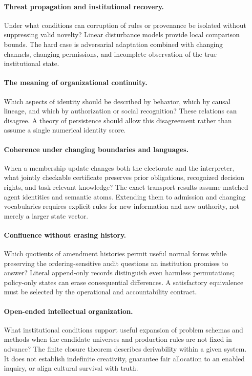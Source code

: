 \documentclass[11pt,letterpaper]{article}
\theoremstyle{plain}
\theoremstyle{definition}
\theoremstyle{remark}
\begin{document}
\paragraph{Threat propagation and institutional recovery.}
Under what conditions can corruption of rules or provenance be isolated without suppressing valid novelty? Linear disturbance models provide local comparison bounds. The hard case is adversarial adaptation combined with changing channels, changing permissions, and incomplete observation of the true institutional state.

\paragraph{The meaning of organizational continuity.}
Which aspects of identity should be described by behavior, which by causal lineage, and which by authorization or social recognition? These relations can disagree. A theory of persistence should allow this disagreement rather than assume a single numerical identity score.

\paragraph{Coherence under changing boundaries and languages.}
When a membership update changes both the electorate and the interpreter, what jointly checkable certificate preserves prior obligations, recognized decision rights, and task-relevant knowledge? The exact transport results assume matched agent identities and semantic atoms. Extending them to admission and changing vocabularies requires explicit rules for new information and new authority, not merely a larger state vector.

\paragraph{Confluence without erasing history.}
Which quotients of amendment histories permit useful normal forms while preserving the ordering-sensitive audit questions an institution promises to answer? Literal append-only records distinguish even harmless permutations; policy-only states can erase consequential differences. A satisfactory equivalence must be selected by the operational and accountability contract.

\paragraph{Open-ended intellectual organization.}
What institutional conditions support useful expansion of problem schemas and methods when the candidate universes and production rules are not fixed in advance? The finite closure theorem describes derivability within a given system. It does not establish indefinite creativity, guarantee fair allocation to an enabled inquiry, or align cultural survival with truth.
\end{document}
